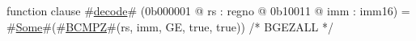 function clause #\hyperref[zdecode]{decode}# (0b000001 @ rs : regno @ 0b10011 @ imm : imm16) =
  #\hyperref[zSome]{Some}#(#\hyperref[zBCMPZ]{BCMPZ}#(rs, imm, GE, true, true))   /* BGEZALL */
